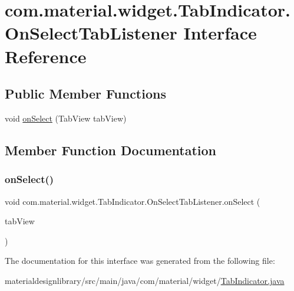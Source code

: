 \hypertarget{interfacecom_1_1material_1_1widget_1_1_tab_indicator_1_1_on_select_tab_listener}{}\section{com.\+material.\+widget.\+Tab\+Indicator.\+On\+Select\+Tab\+Listener Interface Reference}
\label{interfacecom_1_1material_1_1widget_1_1_tab_indicator_1_1_on_select_tab_listener}
\subsection*{Public Member Functions}
\begin{DoxyCompactItemize}
\item 
void \hyperlink{interfacecom_1_1material_1_1widget_1_1_tab_indicator_1_1_on_select_tab_listener_ae6f9973f31cb1a9dc36d93f57bf0f127}{on\+Select} (Tab\+View tab\+View)
\end{DoxyCompactItemize}


\subsection{Member Function Documentation}
\mbox{\label{interfacecom_1_1material_1_1widget_1_1_tab_indicator_1_1_on_select_tab_listener_ae6f9973f31cb1a9dc36d93f57bf0f127}} 
\subsubsection{\texorpdfstring{on\+Select()}{onSelect()}}
{\footnotesize\ttfamily void com.\+material.\+widget.\+Tab\+Indicator.\+On\+Select\+Tab\+Listener.\+on\+Select (\begin{DoxyParamCaption}\item[{Tab\+View}]{tab\+View }\end{DoxyParamCaption})}



The documentation for this interface was generated from the following file\+:\begin{DoxyCompactItemize}
\item 
materialdesignlibrary/src/main/java/com/material/widget/\hyperlink{_tab_indicator_8java}{Tab\+Indicator.\+java}\end{DoxyCompactItemize}
